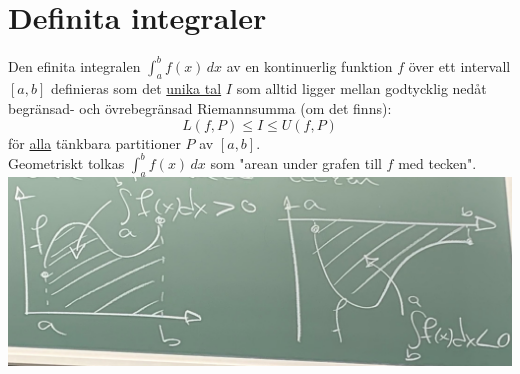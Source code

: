 \chapter{Definita integraler}
Den efinita integralen $\int_a^b f(x)\, dx$ av en kontinuerlig funktion
$f$ över ett intervall $[a,b]$ definieras som det \underline{unika tal}
$I$ som alltid ligger mellan godtycklig nedåt begränsad- och övrebegränsad Riemannsumma (om det finns):
\begin{equation*}
    L(f,P)\leq I \leq U(f,P)
\end{equation*}
för \underline{alla} tänkbara partitioner $P$ av $[a,b]$.\\
Geometriskt tolkas $\int_a^b f(x)\, dx$ som "arean under grafen till $f$ med tecken".\\
\includegraphics[scale=0.1]{lessons/lesson15/imgs/img01.jpg}\\

